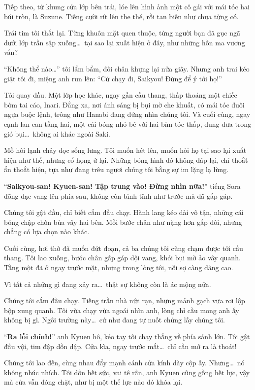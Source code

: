 \documentclass[../main.tex]{subfiles}
\begin{document}
Tiếp theo, từ khung cửa lớp bên trái, lóe lên hình ảnh một cô gái với mái tóc hai búi tròn, là Suzune. Tiếng cười rít lên the thé, rồi tan biến như chưa từng có.

Trái tim tôi thắt lại. Từng khuôn mặt quen thuộc, từng người bạn đã gục ngã dưới lớp trần sập xuống\dots\ tại sao lại xuất hiện ở đây, như những hồn ma vương vấn?

``Không thể nào\dots'' tôi lẩm bẩm, đôi chân khựng lại nửa giây. Nhưng anh trai kéo giật tôi đi, miệng anh run lên: ``Cứ chạy đi, Saikyou! Đừng để ý tới họ!''

Tôi quay đầu. Một lớp học khác, ngay gần cầu thang, thấp thoáng một chiếc bờm tai cáo, Inari. Đằng xa, nơi ánh sáng bị bụi mờ che khuất, có mái tóc đuôi ngựa buộc lệnh, trông như Hanabi đang đứng nhìn chúng tôi. Và cuối cùng, ngay cạnh lan can tầng hai, một cái bóng nhỏ bé với hai bím tóc thấp, đung đưa trong gió bụi\dots\ không ai khác ngoài Saki.

Mồ hôi lạnh chảy dọc sống lưng. Tôi muốn hét lên, muốn hỏi họ tại sao lại xuất hiện như thế, nhưng cổ họng ứ lại. Những bóng hình đó không đáp lại, chỉ thoắt ẩn thoắt hiện, tựa như đang trêu ngươi chúng tôi bằng sự im lặng lạ lùng.

``\textbf{Saikyou-san! Kyuen-san! Tập trung vào! Đừng nhìn nữa!}'' tiếng Sora dõng dạc vang lên phía sau, không còn bình tĩnh như trước mà đã gấp gáp.

Chúng tôi gật đầu, chỉ biết cắm đầu chạy. Hành lang kéo dài vô tận, những cái bóng chập chờn bủa vây hai bên. Mỗi bước chân như nặng hơn gấp đôi, nhưng chẳng có lựa chọn nào khác.

Cuối cùng, hơi thở đã muốn đứt đoạn, cả ba chúng tôi cũng chạm được tới cầu thang. Tôi lao xuống, bước chân gấp gáp dội vang, khói bụi mờ ảo vây quanh. Tầng một đã ở ngay trước mặt, nhưng trong lòng tôi, nỗi sợ càng dâng cao.

Vì tất cả những gì đang xảy ra\dots\ thật sự không còn là ác mộng nữa.

\ct

Chúng tôi cắm đầu chạy. Tiếng trần nhà nứt rạn, những mảnh gạch vữa rơi lộp bộp xung quanh. Tôi vừa chạy vừa ngoái nhìn anh, lòng chỉ cầu mong anh ấy không bị gì. Ngôi trường này\dots\ cứ như đang tự nuốt chửng lấy chúng tôi.

``\textbf{Ra lối chính!}'' anh Kyuen hô, kéo tay tôi chạy thẳng về phía sảnh lớn. Tôi gật đầu vội, tim đập dồn dập. Cửa kìa, ngay trước mắt\dots\ chỉ cần mở ra là thoát!

Chúng tôi lao đến, cùng nhau đẩy mạnh cánh cửa kính dày cộp ấy. Nhưng\dots\ nó không nhúc nhích. Tôi dồn hết sức, vai tê rần, anh Kyuen cũng gồng hết lực, vậy mà cửa vẫn đóng chặt, như bị một thế lực nào đó khóa lại.
\end{document}
